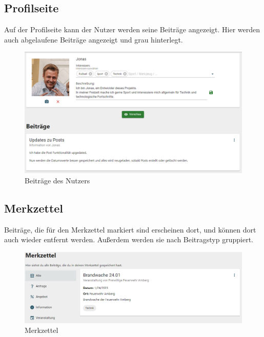 \clearpage
\subsection{Profilseite}
\label{sec:profilepage}

Auf der Profilseite kann der Nutzer werden seine Beiträge angezeigt.
Hier werden auch abgelaufene Beiträge angezeigt und grau hinterlegt.

\begin{figure}[ht!]
  \begin{centering}
    \includegraphics[width=1\textwidth]{figures/implementation/userposts.png}
    \caption{Beiträge des Nutzers}
    \label{fig:userposts}
  \end{centering}
\end{figure}

\subsection{Merkzettel}
\label{sec:bookmark}

Beiträge, die für den Merkzettel markiert sind erscheinen dort, und können dort auch wieder entfernt werden.
Außerdem werden sie nach Beitragstyp gruppiert.

\begin{figure}[ht!]
  \begin{centering}
    \includegraphics[width=1\textwidth]{figures/implementation/merkzettel.png}
    \caption{Merkzettel}
    \label{fig:merkzettel}
  \end{centering}
\end{figure}

